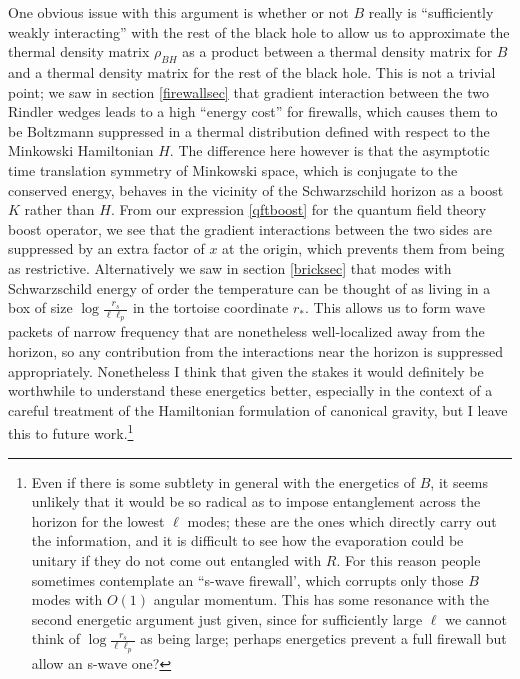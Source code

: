 \documentclass[12pt]{article}
\begin{document}
One obvious issue with this argument is whether or not $B$ really is ``sufficiently weakly interacting'' with the rest of the black hole to allow us to approximate the thermal density matrix $\rho_{BH}$ as a product between a thermal density matrix for $B$ and a thermal density matrix for the rest of the black hole.  This is not a trivial point; we saw in section \ref{firewallsec} that gradient interaction between the two Rindler wedges leads to a high ``energy cost'' for firewalls, which causes them to be Boltzmann suppressed  in a thermal distribution defined with respect to the Minkowski Hamiltonian $H$.  The difference here however is that the asymptotic time translation symmetry of Minkowski space, which is conjugate to the conserved energy, behaves in the vicinity of the Schwarzschild horizon as a boost $K$ rather than $H$.  From our expression \eqref{qftboost} for the quantum field theory boost operator, we see that the gradient interactions between the two sides are suppressed by an extra factor of $x$ at the origin, which prevents them from being as restrictive.  Alternatively we saw in section \ref{bricksec} that modes with Schwarzschild energy of order the temperature can be thought of as living in a box of size $\log \frac{r_s}{\ell \ell_p}$ in the tortoise coordinate $r_*$.  This allows us to form wave packets of narrow frequency that are nonetheless well-localized away from the horizon, so any contribution from the interactions near the horizon is suppressed appropriately.  Nonetheless I think that given the stakes it would definitely be worthwhile to understand these energetics better, especially in the context of a careful treatment of the Hamiltonian formulation of canonical gravity, but I leave this to future work.\footnote{Even if there is some subtlety in general with the energetics of $B$, it seems unlikely that it would be so radical as to impose entanglement across the horizon for the lowest $\ell$ modes; these are the ones which directly carry out the information, and it is difficult to see how the evaporation could be unitary if they do not come out entangled with $R$.  For this reason people sometimes contemplate an ``s-wave firewall', which corrupts only those $B$ modes with $O(1)$ angular momentum.  This has some resonance with the second energetic argument just given, since for sufficiently large $\ell$ we cannot think of $\log \frac{r_s}{\ell \ell_p}$ as being large; perhaps energetics prevent a full firewall but allow an s-wave one?}
\end{document}
